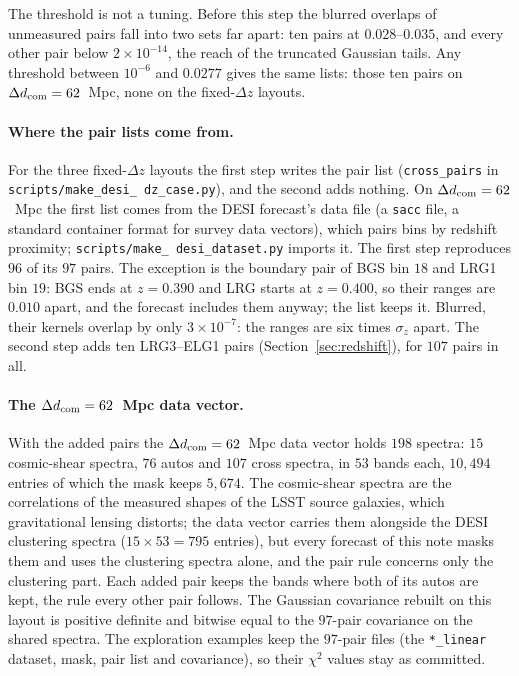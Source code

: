 \documentclass[11pt]{article}
\newcommand{\dcom}{$\Delta d_{\rm com} = 62$~Mpc}
\newcommand{\us}{\_\allowbreak}
\begin{document}
The threshold is not a tuning.  Before this step the blurred overlaps
of unmeasured pairs fall into two sets far apart: ten pairs at
$0.028$--$0.035$, and every other pair below $2 \times 10^{-14}$, the
reach of the truncated Gaussian tails.  Any threshold between $10^{-6}$
and $0.0277$ gives the same lists: those ten pairs on \dcom{}, none on
the fixed-$\Delta z$ layouts.

\paragraph{Where the pair lists come from.}
For the three fixed-$\Delta z$ layouts the first step writes the pair
list (\texttt{cross\us pairs} in \texttt{scripts/make\us desi\us
dz\us case.py}), and the second adds nothing.  On \dcom{} the first
list comes from the DESI forecast's data file (a \texttt{sacc} file,
a standard container format for survey data vectors),
which pairs bins by redshift proximity; \texttt{scripts/make\us
desi\us dataset.py} imports it.  The first step reproduces $96$ of its
$97$ pairs.  The exception is the boundary pair of BGS bin $18$ and
LRG1 bin $19$: BGS ends at $z = 0.390$ and LRG starts at $z = 0.400$,
so their ranges are $0.010$ apart, and the forecast includes them
anyway; the list keeps it.  Blurred, their kernels overlap by only
$3 \times 10^{-7}$: the ranges are six times $\sigma_z$ apart.  The second step adds ten LRG3--ELG1 pairs
(Section~\ref{sec:redshift}), for $107$ pairs in all.

\paragraph{The \dcom{} data vector.}
With the added pairs the \dcom{} data vector holds $198$ spectra:
$15$ cosmic-shear spectra, $76$ autos and $107$ cross spectra, in $53$
bands each, $10{,}494$ entries of which the mask keeps $5{,}674$.
The cosmic-shear spectra are the correlations of the measured shapes
of the LSST source galaxies, which gravitational lensing distorts;
the data vector carries them alongside the DESI clustering spectra
($15 \times 53 = 795$ entries), but every forecast of this note masks
them and uses the clustering spectra alone, and the pair rule concerns
only the clustering part.  Each
added pair keeps the bands where both of its autos are kept, the rule
every other pair follows.  The Gaussian covariance rebuilt on this
layout is positive definite and bitwise equal to the $97$-pair
covariance on the shared spectra.  The exploration examples keep the $97$-pair files
(the \texttt{*\us linear} dataset, mask, pair list and covariance), so
their $\chi^2$ values stay as committed.
\end{document}
